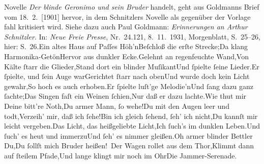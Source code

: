 \begin{ledgroupsized}[t]{13cm}
{{{                        Novelle \emph{Der blinde Geronimo und sein
                           Bruder} handelt, geht aus Goldmanns Brief vom 18. 2. [1901] hervor, in dem Schnitzlers Novelle als gegenüber der Vorlage fahl kritisiert wird. Siehe dazu
                        auch Paul Goldmann: \emph{Erinnerungen an Arthur Schnitzler}. In: \emph{Neue Freie Presse}, Nr. 24.121, 8. 11. 1931, Morgenblatt, S. 25–26, hier:
                           S. 26.}}}\label{K_L02928-1h}\stanzaend{}\stanza{}Ein altes Haus auf Paſſes Höh’n\newverse{}Beſchloß die erſte Strecke;\newverse{}Da klang Harmonika-Getön\newverse{}Hervor aus dunkler Ecke.\stanzaend{}\stanza{}Gelehnt an regenfeuchte Wand,\newverse{}Von Kälte ſtarr die Glieder,\newverse{}Stand dort ein blinder Muſikant\newverse{}Und ſpielte ſeine Lieder.\stanzaend{}\stanza{}Er ſpielte, und ſein Auge war\newverse{}Gerichtet ſtarr nach oben\newverse{}Und wurde doch kein Licht gewahr,\newverse{}So hoch es auch erhoben.\stanzaend{}\stanza{}{\pb}Er ſpielte luſt’ge Melodie’n\newverse{}Und ſang dazu ganz ſachte;\newverse{}Das Singen faſt ein Weinen ſchien,\newverse{}Nur daß er dazu lachte.\stanzaend{}\stanza{}Wie thut mir Deine bitt’re Noth,\newverse{}Du armer Mann, ſo wehe!\newverse{}Du mit den Augen leer und todt,\newverse{}Verzeih’ mir, daß ich ſehe!\stanzaend{}\stanza{}Bin ich gleich ſehend, ſeh’ ich  nicht,\newverse{}Du kannſt mir leicht vergeben.\newverse{}Das Licht, das heißgeliebte Licht,\newverse{}Ich ſuch’s im dunklen Leben.\stanzaend{}\stanza{}Und ſuch’ es heut und immerzu\newverse{}Und ſeh’ es nimmer gleißen.\newverse{}Oh armer blinder Bettler Du,\newverse{}Du ſollſt mich Bruder heißen! {\dotssix}\stanzaend{}\stanza{}Der Wagen rollet aus dem Thor,\newverse{}Klimmt dann auf ſteilem Pfade,\newverse{}Und lange klingt mir noch im Ohr\newverse{}Die Jammer-Serenade.\stanzaend{}\pstart

\end{ledgroupsized}
